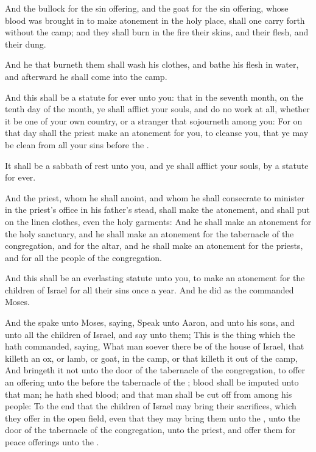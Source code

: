 \Verse And the bullock for the sin offering, and the goat for the sin offering, whose blood was brought in to make atonement in the holy place, shall one carry forth without the camp; and they shall burn in the fire their skins, and their flesh, and their dung.

\Verse And he that burneth them shall wash his clothes, and bathe his flesh in water, and afterward he shall come into the camp.

\Verse And this shall be a statute for ever unto you: that in the seventh month, on the tenth day of the month, ye shall afflict your souls, and do no work at all, whether it be one of your own country, or a stranger that sojourneth among you: \Verse For on that day shall the priest make an atonement for you, to cleanse you, that ye may be clean from all your sins before the \LORD.

\Verse It shall be a sabbath of rest unto you, and ye shall afflict your souls, by a statute for ever.

\Verse And the priest, whom he shall anoint, and whom he shall consecrate to minister in the priest's office in his father's stead, shall make the atonement, and shall put on the linen clothes, even the holy garments: \Verse And he shall make an atonement for the holy sanctuary, and he shall make an atonement for the tabernacle of the congregation, and for the altar, and he shall make an atonement for the priests, and for all the people of the congregation.

\Verse And this shall be an everlasting statute unto you, to make an atonement for the children of Israel for all their sins once a year.  And he did as the \LORD commanded Moses.

\Chapter
\Verse And the \LORD spake unto Moses, saying, \Verse Speak unto Aaron, and unto his sons, and unto all the children of Israel, and say unto them; This is the thing which the \LORD hath commanded, saying, \Verse What man soever there be of the house of Israel, that killeth an ox, or lamb, or goat, in the camp, or that killeth it out of the camp, \Verse And bringeth it not unto the door of the tabernacle of the congregation, to offer an offering unto the \LORD before the tabernacle of the \LORD; blood shall be imputed unto that man; he hath shed blood; and that man shall be cut off from among his people: \Verse To the end that the children of Israel may bring their sacrifices, which they offer in the open field, even that they may bring them unto the \LORD, unto the door of the tabernacle of the congregation, unto the priest, and offer them for peace offerings unto the \LORD.

